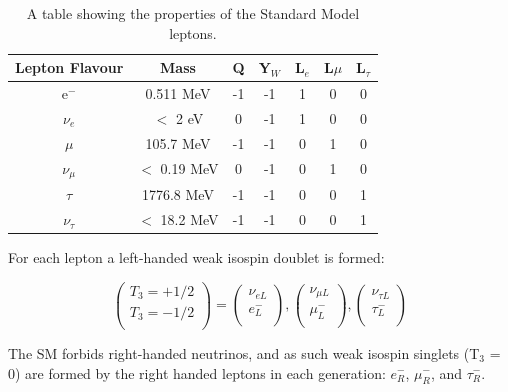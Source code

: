 \documentclass[12pt,a4paper,epsf,portrait,times,epsfig]{report}
\begin{document}
\begin{table}
	\begin{center}
		\begin{tabular}{ |c|c|c|c|c|c|c| }
			\hline \hline
			Lepton Flavour & Mass & Q & Y$_{W}$ & L$_{e}$ & L${\mu}$ & L$_{\tau}$ \\
			\hline
			e$^{-}$ & 0.511 MeV & -1 & -1 & 1 & 0 & 0 \\
			\hline
			$\nu_{e}$ & $<$ 2 eV & 0 & -1 & 1 & 0 & 0 \\
			\hline
			$\mu$ & 105.7 MeV & -1 & -1 & 0 & 1 & 0 \\
			\hline
			$\nu_{\mu}$ & $<$ 0.19 MeV & 0 & -1 & 0 & 1 & 0 \\
			\hline
			$\tau$ & 1776.8 MeV & -1 & -1 & 0 & 0 & 1 \\
			\hline
			$\nu_{\tau}$ & $<$ 18.2 MeV & -1 & -1 & 0 & 0 & 1 \\
			\hline \hline
		\end{tabular}
		\caption{A table showing the properties of the Standard Model leptons\cite{Article:PDG}.}
		\label{tab:SMLeptons}
	\end{center}
\end{table}

For each lepton a left-handed weak isospin doublet is formed:

\begin{equation}
	\begin{pmatrix}
		T_{3} = +1/2  \\
		T_{3} = -1/2  \\
	\end{pmatrix}=\begin{pmatrix}
		\nu_{eL} \\
		e_{L}^{-} \\
	\end{pmatrix},\begin{pmatrix}
		\nu_{\mu L} \\
		\mu_{L}^{-} \\
	\end{pmatrix},\begin{pmatrix}
		\nu_{\tau L} \\
		\tau_{L}^{-} \\
	\end{pmatrix}
\end{equation}

The SM forbids right-handed neutrinos, and as such weak isospin singlets (T$_{3}$ = 0) are formed by the right handed leptons in each generation: $e^{-}_{R}$, $\mu^{-}_{R}$, and $\tau^{-}_{R}$. 
\end{document}
